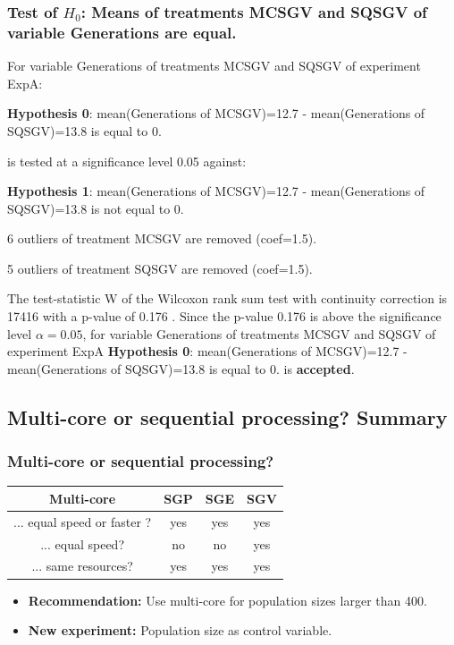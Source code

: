 \documentclass[18pt,c]{beamer}
\makeatletter
\let\beamer@writeslidentry@miniframeson=\beamer@writeslidentry
\newcommand*{\miniframeson}{\let\beamer@writeslidentry=\beamer@writeslidentry@miniframeson}
\makeatother
\begin{document}
\begin{frame}[t]
 \frametitle{Test of $H_{0}$: Means of treatments MCSGV and SQSGV of variable Generations are equal. }
 \scriptsize
 For variable Generations of treatments MCSGV and SQSGV of experiment ExpA:

\vspace{1mm}
{\bf Hypothesis 0}: mean(Generations of MCSGV)=12.7 - mean(Generations of SQSGV)=13.8 is equal to 0.


 \begin{center} is tested at a significance level 0.05 against: \end{center}

{\bf Hypothesis 1}: mean(Generations of MCSGV)=12.7 - mean(Generations of SQSGV)=13.8 is not equal to 0.
\vspace{1mm}
\vspace{1mm}

 6 outliers of treatment MCSGV are removed (coef=1.5).

 5 outliers of treatment SQSGV are removed (coef=1.5).
\vspace{1mm}
 
 The test-statistic W of the Wilcoxon rank sum test with continuity correction is 17416 with a p-value of 0.176 .
 Since the p-value 0.176 is above the significance level $\alpha= 0.05 $,
 for variable Generations of treatments MCSGV and SQSGV of experiment ExpA 
 {\bf Hypothesis 0}: mean(Generations of MCSGV)=12.7 - mean(Generations of SQSGV)=13.8 is equal to 0.
is {\bf accepted}.

 \end{frame}
\miniframeson
\subsection{Multi-core or sequential processing? Summary}
\begin{frame}
\frametitle{
Multi-core or sequential processing?
}
\begin{center}
\begin{tabular}{c|ccc}
\hline
  Multi-core             & SGP & SGE & SGV \\
\hline
  ... equal speed or faster ?  & yes & yes & yes \\
  ... equal speed?       &  no &  no & yes \\
  ... same resources?    & yes & yes & yes \\
\hline
\end{tabular}
\end{center}
 
\vspace{2mm} 
\begin{itemize}
\item {\bf Recommendation:} Use multi-core for 
       population sizes larger than 400.
\item {\bf New experiment:} Population size as control variable.
\end{itemize}
\end{frame}%
\miniframeson
\end{document}
